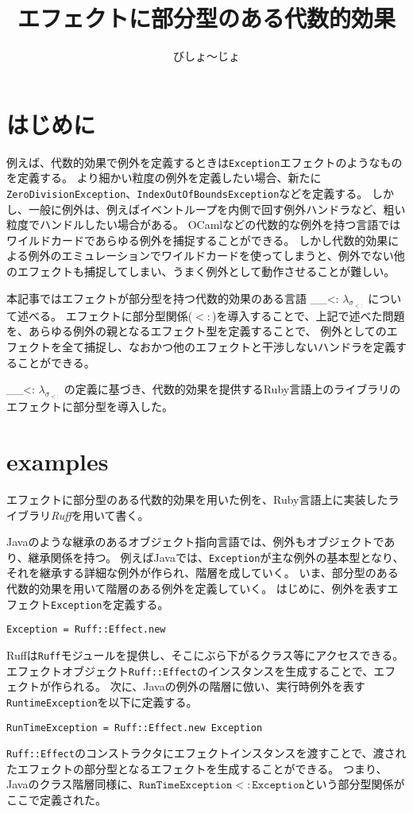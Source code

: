 \documentclass{ltjsarticle}
\author{びしょ〜じょ}
\title{エフェクトに部分型のある代数的効果}
\def\effsub{
  \ifmmode
    \lambda_{\sigma_{<:}}
  \else
    $\lambda_{\sigma_{<:}}$
  \fi
}
\begin{document}
\maketitle

\section{はじめに}

例えば、代数的効果で例外を定義するときは\texttt{Exception}エフェクトのようなものを定義する。
より細かい粒度の例外を定義したい場合、新たに\texttt{ZeroDivisionException}、\texttt{IndexOutOfBoundsException}などを定義する。
しかし、一般に例外は、例えばイベントループを内側で回す例外ハンドラなど、粗い粒度でハンドルしたい場合がある。
OCamlなどの代数的な例外を持つ言語ではワイルドカードであらゆる例外を捕捉することができる。
しかし代数的効果による例外のエミュレーションでワイルドカードを使ってしまうと、例外でない他のエフェクトも捕捉してしまい、うまく例外として動作させることが難しい。

本記事ではエフェクトが部分型を持つ代数的効果のある言語\effsub{}について述べる。
エフェクトに部分型関係($<:$)を導入することで、上記で述べた問題を、あらゆる例外の親となるエフェクト型を定義することで、%
  例外としてのエフェクトを全て捕捉し、なおかつ他のエフェクトと干渉しないハンドラを定義することができる。

\effsub{}の定義に基づき、代数的効果を提供するRuby言語上のライブラリのエフェクトに部分型を導入した。

\section{examples} \label{sec:examples}
エフェクトに部分型のある代数的効果を用いた例を、Ruby言語上に実装したライブラリ\textit{Ruff}\footnotemark{}を用いて書く。

Javaのような継承のあるオブジェクト指向言語では、例外もオブジェクトであり、継承関係を持つ。
例えばJavaでは、\texttt{Exception}が主な例外の基本型となり、それを継承する詳細な例外が作られ、階層を成していく。
いま、部分型のある代数的効果を用いて階層のある例外を定義していく。
はじめに、例外を表すエフェクト\texttt{Exception}を定義する。
\begin{lstlisting}
Exception = Ruff::Effect.new
\end{lstlisting}
Ruffは\lstinline{Ruff}モジュールを提供し、そこにぶら下がるクラス等にアクセスできる。
エフェクトオブジェクト\lstinline{Ruff::Effect}のインスタンスを生成することで、エフェクトが作られる。
次に、Javaの例外の階層に倣い、実行時例外を表す\texttt{RuntimeException}を以下に定義する。
\begin{lstlisting}
RunTimeException = Ruff::Effect.new Exception
\end{lstlisting}
\lstinline{Ruff::Effect}のコンストラクタにエフェクトインスタンスを渡すことで、渡されたエフェクトの部分型となるエフェクトを生成することができる。
つまり、Javaのクラス階層同様に、$\mathtt{RunTimeException} <: \mathtt{Exception}$という部分型関係がここで定義された。
\end{document}
